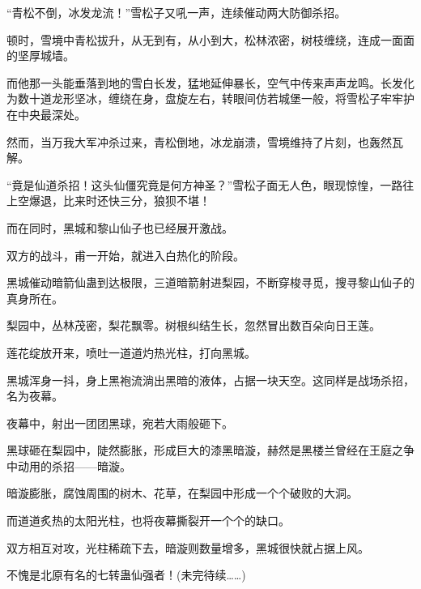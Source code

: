 \begin{this_body}
“青松不倒，冰发龙流！”雪松子又吼一声，连续催动两大防御杀招。

顿时，雪境中青松拔升，从无到有，从小到大，松林浓密，树枝缠绕，连成一面面的坚厚城墙。

而他那一头能垂落到地的雪白长发，猛地延伸暴长，空气中传来声声龙鸣。长发化为数十道龙形坚冰，缠绕在身，盘旋左右，转眼间仿若城堡一般，将雪松子牢牢护在中央最深处。

然而，当万我大军冲杀过来，青松倒地，冰龙崩溃，雪境维持了片刻，也轰然瓦解。

“竟是仙道杀招！这头仙僵究竟是何方神圣？”雪松子面无人色，眼现惊惶，一路往上空爆退，比来时还快三分，狼狈不堪！

而在同时，黑城和黎山仙子也已经展开激战。

双方的战斗，甫一开始，就进入白热化的阶段。

黑城催动暗箭仙蛊到达极限，三道暗箭射进梨园，不断穿梭寻觅，搜寻黎山仙子的真身所在。

梨园中，丛林茂密，梨花飘零。树根纠结生长，忽然冒出数百朵向日王莲。

莲花绽放开来，喷吐一道道灼热光柱，打向黑城。

黑城浑身一抖，身上黑袍流淌出黑暗的液体，占据一块天空。这同样是战场杀招，名为夜幕。

夜幕中，射出一团团黑球，宛若大雨般砸下。

黑球砸在梨园中，陡然膨胀，形成巨大的漆黑暗漩，赫然是黑楼兰曾经在王庭之争中动用的杀招——暗漩。

暗漩膨胀，腐蚀周围的树木、花草，在梨园中形成一个个破败的大洞。

而道道炙热的太阳光柱，也将夜幕撕裂开一个个的缺口。

双方相互对攻，光柱稀疏下去，暗漩则数量增多，黑城很快就占据上风。

不愧是北原有名的七转蛊仙强者！(未完待续……)

\end{this_body}

